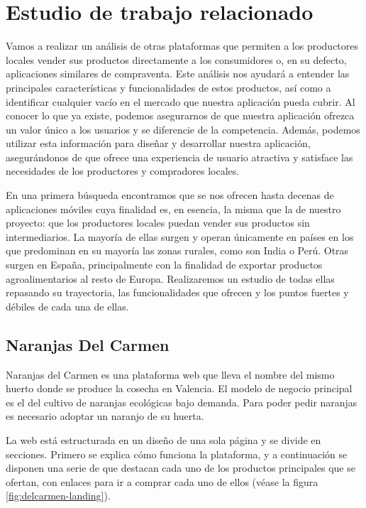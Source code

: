 \section{Estudio de trabajo relacionado}\label{sec:estudio-trabajo-relacionado}

Vamos a realizar un análisis de otras plataformas que permiten a los productores locales vender sus productos directamente a los consumidores o, en su defecto, aplicaciones similares de compraventa. Este análisis nos ayudará a entender las principales características y funcionalidades de estos productos, así como a identificar cualquier vacío en el mercado que nuestra aplicación pueda cubrir. Al conocer lo que ya existe, podemos asegurarnos de que nuestra aplicación ofrezca un valor único a los usuarios y se diferencie de la competencia. Además, podemos utilizar esta información para diseñar y desarrollar nuestra aplicación, asegurándonos de que ofrece una experiencia de usuario atractiva y satisface las necesidades de los productores y compradores locales.

En una primera búsqueda encontramos que se nos ofrecen hasta decenas de aplicaciones móviles cuya finalidad es, en esencia, la misma que la de nuestro proyecto: que los productores locales puedan vender sus productos sin intermediarios. La mayoría de ellas surgen y operan únicamente en países en los que predominan en su mayoría las zonas rurales, como son India o Perú. Otras surgen en España, principalmente con la finalidad de exportar productos agroalimentarios al resto de Europa. Realizaremos un estudio de todas ellas repasando su trayectoria, las funcionalidades que ofrecen y los puntos fuertes y débiles de cada una de ellas.

\subsection{Naranjas Del Carmen}

Naranjas del Carmen es una plataforma web que lleva el nombre del mismo huerto donde se produce la cosecha en Valencia. El modelo de negocio principal es el del cultivo de naranjas ecológicas bajo demanda. Para poder pedir naranjas es necesario adoptar un naranjo de su huerta.

La web está estructurada en un diseño de una sola página y se divide en secciones. Primero se explica cómo funciona la plataforma, y a continuación se disponen una serie de  que destacan cada uno de los productos principales que se ofertan, con enlaces para ir a comprar cada uno de ellos (véase la figura \ref{fig:delcarmen-landing}).

